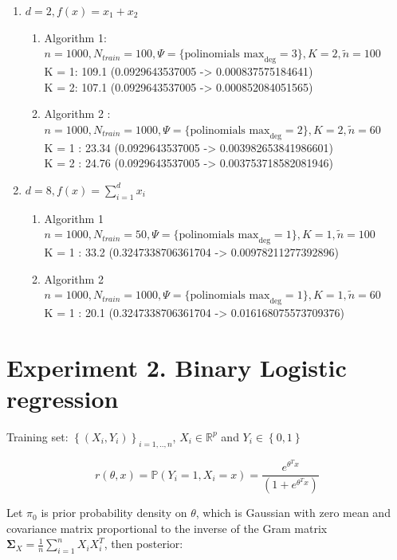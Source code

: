 \documentclass[a4paper]{article}
\begin{document}
\begin{enumerate}
    \item $d =2, f(x) = x_1 + x_2$
    \begin{enumerate}
    \item Algorithm 1: $n = 1000,N_{train} = 100, \Psi = \{\text{polinomials max}_\text{deg} = 3\}, K =2, \tilde{n} = 100$\\
    K = 1: 109.1 (0.0929643537005 -> 0.000837575184641)\\
    K = 2: 107.1 (0.0929643537005 -> 0.000852084051565)
    
    \item Algorithm 2 :$n = 1000,N_{train} = 1000, \Psi = \{\text{polinomials max}_\text{deg} = 2\}, K =2, \tilde{n} = 60$\\
    K = 1 : 23.34 (0.0929643537005 -> 0.003982653841986601)\\
    K = 2 : 24.76 (0.0929643537005 -> 0.003753718582081946)
    \end{enumerate}
    \item $d =8, f(x) = \sum_{i=1}^d x_i$
    \begin{enumerate}
        
    \item Algorithm 1 $n = 1000,N_{train} = 50, \Psi = \{\text{polinomials max}_\text{deg} = 1\}, K =1, \tilde{n} = 100$\\
    K = 1 : 33.2 (0.3247338706361704 -> 0.00978211277392896)
    
    \item Algorithm 2 $n = 1000,N_{train} = 1000, \Psi = \{\text{polinomials max}_\text{deg} = 1\}, K =1, \tilde{n} = 60$\\
    K = 1 : 20.1 (0.3247338706361704 -> 0.016168075573709376)
    \end{enumerate}
\end{enumerate}

\section{Experiment 2. Binary Logistic regression}

Training set: $\left\{ (X_i, Y_i)\right\}_{i=1,..,n}$, $X_i \in \mathbb{R}^p$ and $Y_i \in \left\{ 0,1\right\}$

\[ r(\theta, x) = \mathbb{P} (Y_i = 1, X_i = x) = \frac{e^{\theta^T x}}{(1 + e^{\theta^Tx})}\]

Let $\pi_0$ is prior probability density on $\theta$, which is Gaussian with zero mean and covariance matrix proportional to the inverse of the Gram matrix $\mathbf{\Sigma}_X = \frac{1}{n} \sum_{i=1}^n X_i X_i^T$, then posterior:
\end{document}
